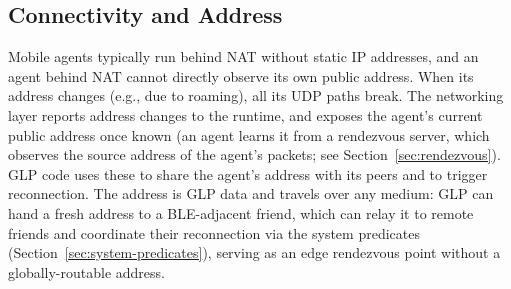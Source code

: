 \subsection{Connectivity and Address}
\label{sec:ip-connectivity}
Mobile agents typically run behind NAT without static IP addresses, and an agent behind NAT cannot directly observe its own public address.  When its address changes (e.g., due to roaming), all its UDP paths break.  The networking layer reports address changes to the runtime, and exposes the agent's current public address once known (an agent learns it from a rendezvous server, which observes the source address of the agent's packets; see Section~\ref{sec:rendezvous}).  GLP code uses these to share the agent's address with its peers and to trigger reconnection.  The address is GLP data and travels over any medium: GLP can hand a fresh address to a BLE-adjacent friend, which can relay it to remote friends and coordinate their reconnection via the system predicates (Section~\ref{sec:system-predicates}), serving as an edge rendezvous point without a globally-routable address.

